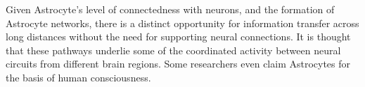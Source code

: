     Given Astrocyte's level of connectedness with neurons, and the formation of
    Astrocyte networks, there is a distinct opportunity for information transfer
    across long distances without the need for supporting neural
    connections. It is thought that these pathways underlie some of the
    coordinated activity between neural circuits from different brain
    regions. Some researchers even claim Astrocytes for the basis of human
    consciousness.
